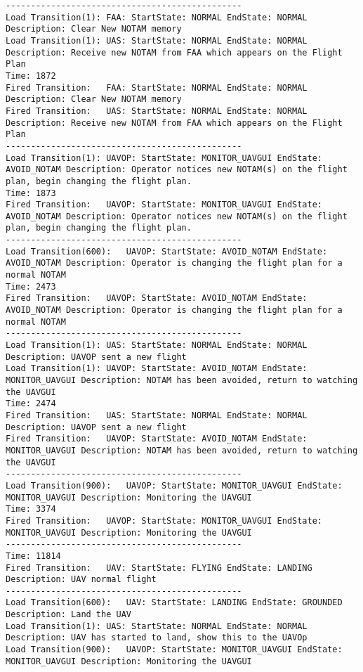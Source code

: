 \begin{spacing}{1}
\begin{verbatim}
-----------------------------------------------
Load Transition(1):	FAA: StartState: NORMAL EndState: NORMAL Description: Clear New NOTAM memory
Load Transition(1):	UAS: StartState: NORMAL EndState: NORMAL Description: Receive new NOTAM from FAA which appears on the Flight Plan
Time: 1872
Fired Transition:	FAA: StartState: NORMAL EndState: NORMAL Description: Clear New NOTAM memory
Fired Transition:	UAS: StartState: NORMAL EndState: NORMAL Description: Receive new NOTAM from FAA which appears on the Flight Plan
-----------------------------------------------
Load Transition(1):	UAVOP: StartState: MONITOR_UAVGUI EndState: AVOID_NOTAM Description: Operator notices new NOTAM(s) on the flight plan, begin changing the flight plan.
Time: 1873
Fired Transition:	UAVOP: StartState: MONITOR_UAVGUI EndState: AVOID_NOTAM Description: Operator notices new NOTAM(s) on the flight plan, begin changing the flight plan.
-----------------------------------------------
Load Transition(600):	UAVOP: StartState: AVOID_NOTAM EndState: AVOID_NOTAM Description: Operator is changing the flight plan for a normal NOTAM
Time: 2473
Fired Transition:	UAVOP: StartState: AVOID_NOTAM EndState: AVOID_NOTAM Description: Operator is changing the flight plan for a normal NOTAM
-----------------------------------------------
Load Transition(1):	UAS: StartState: NORMAL EndState: NORMAL Description: UAVOP sent a new flight
Load Transition(1):	UAVOP: StartState: AVOID_NOTAM EndState: MONITOR_UAVGUI Description: NOTAM has been avoided, return to watching the UAVGUI
Time: 2474
Fired Transition:	UAS: StartState: NORMAL EndState: NORMAL Description: UAVOP sent a new flight
Fired Transition:	UAVOP: StartState: AVOID_NOTAM EndState: MONITOR_UAVGUI Description: NOTAM has been avoided, return to watching the UAVGUI
-----------------------------------------------
Load Transition(900):	UAVOP: StartState: MONITOR_UAVGUI EndState: MONITOR_UAVGUI Description: Monitoring the UAVGUI
Time: 3374
Fired Transition:	UAVOP: StartState: MONITOR_UAVGUI EndState: MONITOR_UAVGUI Description: Monitoring the UAVGUI
-----------------------------------------------
Time: 11814
Fired Transition:	UAV: StartState: FLYING EndState: LANDING Description: UAV normal flight
-----------------------------------------------
Load Transition(600):	UAV: StartState: LANDING EndState: GROUNDED Description: Land the UAV
Load Transition(1):	UAS: StartState: NORMAL EndState: NORMAL Description: UAV has started to land, show this to the UAVOp
Load Transition(900):	UAVOP: StartState: MONITOR_UAVGUI EndState: MONITOR_UAVGUI Description: Monitoring the UAVGUI

\end{verbatim}
\end{spacing}
